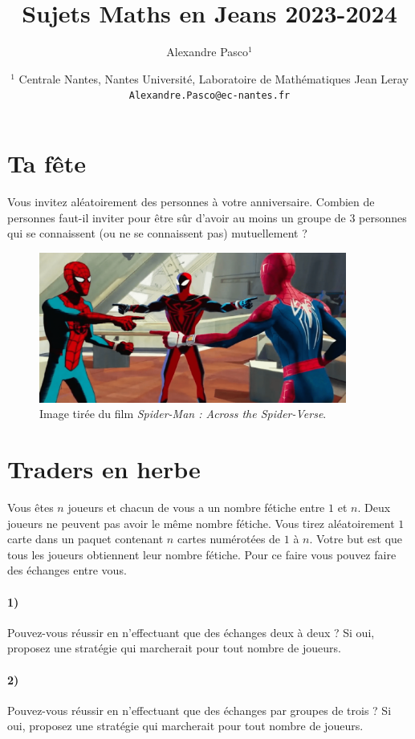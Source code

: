 \documentclass[a4paper,10pt,oneside]{article}
\title{Sujets Maths en Jeans 2023-2024}
\author{
  Alexandre Pasco${}^{1}$}
\date{\medskip%
  \small %
  ${}^1$  Centrale Nantes, Nantes Université, Laboratoire de Mathématiques Jean Leray\\
  \texttt{Alexandre.Pasco@ec-nantes.fr}
  }
\begin{document}
\maketitle


\section{Ta fête}
Vous invitez aléatoirement des personnes à votre anniversaire. 
Combien de personnes faut-il inviter pour être sûr d'avoir au moins un groupe de $3$ personnes qui se connaissent (ou ne se connaissent pas) mutuellement ? 

\vspace{3cm}
\begin{figure}[!ht]
  \centering
  \includegraphics[width=0.9\textwidth]{figures/fete.png}
  \caption*{Image tirée du film \textit{Spider-Man : Across the Spider-Verse}.}
\end{figure}


\section{Traders en herbe}

Vous êtes $n$ joueurs et chacun de vous a un nombre fétiche entre $1$ et $n$. 
Deux joueurs ne peuvent pas avoir le même nombre fétiche.
Vous tirez aléatoirement $1$ carte dans un paquet contenant $n$ cartes numérotées de $1$ à $n$. Votre but est que tous les joueurs obtiennent leur nombre fétiche.
Pour ce faire vous pouvez faire des échanges entre vous.

\paragraph*{1)} 
Pouvez-vous réussir en n'effectuant que des échanges deux à deux ? 
Si oui, proposez une stratégie qui marcherait pour tout nombre de joueurs.

\paragraph*{2)} 
Pouvez-vous réussir en n'effectuant que des échanges par groupes de trois ?
Si oui, proposez une stratégie qui marcherait pour tout nombre de joueurs.
\end{document}
